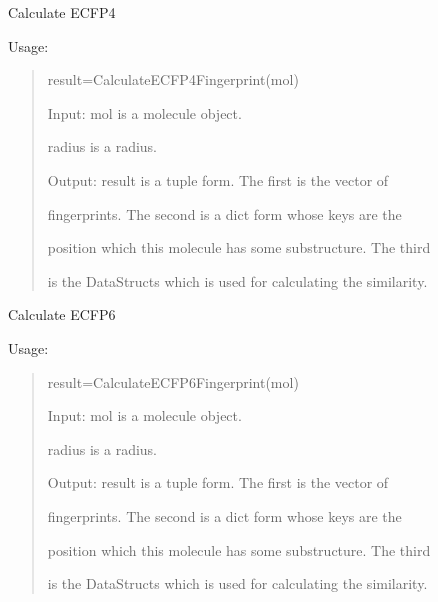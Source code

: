 \documentclass[letterpaper,10pt,english]{sphinxmanual}
\begin{document}
\begin{fulllineitems}
\label{reference/fingerprint:fingerprint.CalculateECFP4Fingerprint}
Calculate ECFP4

Usage:
\begin{quote}

result=CalculateECFP4Fingerprint(mol)

Input: mol is a molecule object.

radius is a radius.

Output: result is a tuple form. The first is the vector of

fingerprints. The second is a dict form whose keys are the

position which this molecule has some substructure. The third

is the DataStructs which is used for calculating the similarity.
\end{quote}

\end{fulllineitems}


\begin{fulllineitems}
\label{reference/fingerprint:fingerprint.CalculateECFP6Fingerprint}
Calculate ECFP6

Usage:
\begin{quote}

result=CalculateECFP6Fingerprint(mol)

Input: mol is a molecule object.

radius is a radius.

Output: result is a tuple form. The first is the vector of

fingerprints. The second is a dict form whose keys are the

position which this molecule has some substructure. The third

is the DataStructs which is used for calculating the similarity.
\end{quote}

\end{fulllineitems}

\end{document}
